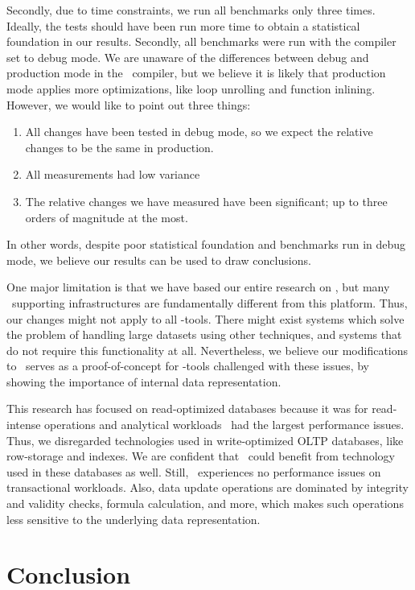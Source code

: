 Secondly, due to time constraints, we run all benchmarks only three times. Ideally, the tests should have been run more time to obtain a statistical foundation in our results. Secondly, all benchmarks were run with the compiler set to debug mode. We are unaware of the differences between debug and production mode in the \delphi~compiler, but we believe it is likely that production mode applies more optimizations, like loop unrolling and function inlining. However, we would like to point out three things: 
\begin{enumerate}
    \item All changes have been tested in debug mode, so we expect the relative changes to be the same in production.
    \item All measurements had low variance
    \item The relative changes we have measured have been significant; up to three orders of magnitude at the most.
\end{enumerate}
In other words, despite poor statistical foundation and benchmarks run in debug mode, we believe our results can be used to draw conclusions.

One major limitation is that we have based our entire research on \gap, but many \mde~supporting infrastructures are fundamentally different from this platform. Thus, our changes might not apply to all \mdd-tools. There might exist systems which solve the problem of handling large datasets using other techniques, and systems that do not require this functionality at all. Nevertheless, we believe our modifications to \gap~serves as a proof-of-concept for \mdd-tools challenged with these issues, by showing the importance of internal data representation.

This research has focused on read-optimized databases because it was for read-intense operations and analytical workloads \gap~had the largest performance issues. Thus, we disregarded technologies used in write-optimized OLTP databases, like row-storage and indexes. We are confident that \gap~could benefit from technology used in these databases as well. Still, \genus~experiences no performance issues on transactional workloads. Also, data update operations are dominated by integrity and validity checks, formula calculation, and more, which makes such operations less sensitive to the underlying data representation.

\section{Conclusion}
\label{sec:Conclusion}

